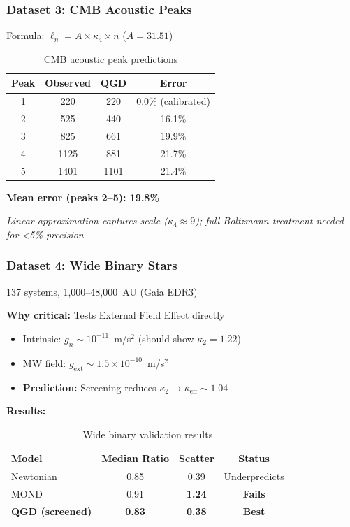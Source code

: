 \documentclass[11pt,a4paper]{article}
\theoremstyle{definition}
\theoremstyle{remark}
\begin{document}
	\subsubsection{Dataset 3: CMB Acoustic Peaks}
	
	Formula: $\ell_n = A \times \kappa_4 \times n$ ($A = 31.51$)
	
	\begin{table}[ht]
		\centering
		\caption{CMB acoustic peak predictions}
		\label{tab:cmb_peaks}
		\begin{tabular}{@{}cccc@{}}
			\toprule
			Peak & Observed & QGD & Error \\
			\midrule
			1 & 220 & 220 & 0.0\% (calibrated) \\
			2 & 525 & 440 & 16.1\% \\
			3 & 825 & 661 & 19.9\% \\
			4 & 1125 & 881 & 21.7\% \\
			5 & 1401 & 1101 & 21.4\% \\
			\bottomrule
		\end{tabular}
	\end{table}
	
	\textbf{Mean error (peaks 2--5): 19.8\%}
	
	\emph{Linear approximation captures scale ($\kappa_4 \approx 9$); full Boltzmann treatment needed for <5\% precision}
	
	\subsubsection{Dataset 4: Wide Binary Stars}
	
	137 systems, 1,000--48,000~AU (Gaia EDR3)
	
	\textbf{Why critical:} Tests External Field Effect directly
	\begin{itemize}
		\item Intrinsic: $g_n \sim 10^{-11}$~m/s$^2$ (should show $\kappa_2 = 1.22$)
		\item MW field: $g_{\text{ext}} \sim 1.5 \times 10^{-10}$~m/s$^2$
		\item \textbf{Prediction:} Screening reduces $\kappa_2 \to \kappa_{\text{eff}} \sim 1.04$
	\end{itemize}
	
	\textbf{Results:}
	
	\begin{table}[ht]
		\centering
		\caption{Wide binary validation results}
		\label{tab:wide_binary}
		\begin{tabular}{@{}lccc@{}}
			\toprule
			Model & Median Ratio & Scatter & Status \\
			\midrule
			Newtonian & 0.85 & 0.39 & Underpredicts \\
			MOND & 0.91 & \textbf{1.24} & \textbf{Fails} \\
			\textbf{QGD (screened)} & \textbf{0.83} & \textbf{0.38} & \checkmark \textbf{Best} \\
			\bottomrule
		\end{tabular}
	\end{table}
	
\end{document}
